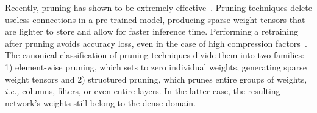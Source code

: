 Recently, pruning has shown to be extremely effective~\cite{DBLP:journals/corr/HanPTD15,DBLP:journals/corr/LiKDSG16,DBLP:journals/corr/HanMD15,DBLP:journals/corr/GuoYC16,luo2017thinet,huang2018data,yu2017scalpel,vieira2017learning,he2017channel,he2018amc}. Pruning techniques delete useless connections in a pre-trained model, producing sparse weight tensors that are lighter to store and allow for faster inference time. Performing a retraining after pruning avoids accuracy loss, even in the case of high compression factors~\cite{DBLP:journals/corr/GuoYC16}. 
The canonical classification of pruning techniques divide them into two families: 1) element-wise pruning, which sets to zero individual weights, generating sparse weight tensors and 2) structured pruning, which prunes entire groups of weights, \textit{i.e.,} columns, filters, or even entire layers. In the latter case, the resulting network's weights still belong to the dense domain. 
